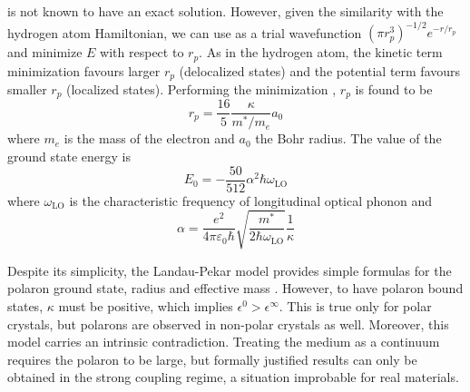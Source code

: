  is not known to have an exact solution. However, given the similarity with the hydrogen atom Hamiltonian, we can use as a trial wavefunction $(\pi r_p^3)^{-1/2} e^{-r/r_p}$ and minimize $E$ with respect to $r_p$. As in the hydrogen atom, the kinetic term minimization favours larger $r_p$ (delocalized states) and the potential term favours smaller $r_p$ (localized states). Performing the minimization \cite{alexandrov2010}, $r_p$ is found to be
\begin{equation}
    r_p = \frac{16}{5} \frac{\kappa}{m^*/m_e} a_0
\end{equation}
where $m_e$ is the mass of the electron and $a_0$ the Bohr radius. The value of the ground state energy is
\begin{equation}
    E_0 = -\frac{50}{512} \alpha^2 \hbar \omega_\text{LO}
\end{equation}
where $\omega_\text{LO}$ is the characteristic frequency of longitudinal optical phonon and
\begin{equation}
    \alpha = \frac{e^2}{4\pi\varepsilon_0\hbar} \sqrt{\frac{m^*}{2\hbar\omega_\text{LO}}} \frac{1}{\kappa}
\end{equation}

Despite its simplicity, the Landau-Pekar model provides simple formulas for the polaron ground state, radius and effective mass \cite{landau1948}. However, to have polaron bound states, $\kappa$ must be positive, which implies $\epsilon^0 > \epsilon^\infty$. This is true only for polar crystals, but polarons are observed in non-polar crystals as well. Moreover, this model carries an intrinsic contradiction. Treating the medium as a continuum requires the polaron to be large, but formally justified results can only be obtained in the strong coupling regime, a situation improbable for real materials.